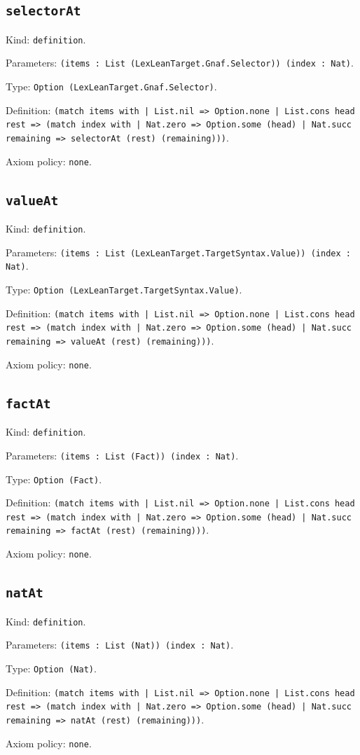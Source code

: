 \documentclass[11pt]{article}
\begin{document}
\subsection*{\texttt{selectorAt}}
\noindent Kind: \texttt{definition}.\par
\noindent Parameters: \texttt{(items : List (LexLeanTarget.Gnaf.Selector)) (index : Nat)}.\par
\noindent Type: \texttt{Option (LexLeanTarget.Gnaf.Selector)}.\par
\noindent Definition: \texttt{(match items with | List.nil => Option.none | List.cons head rest => (match index with | Nat.zero => Option.some (head) | Nat.succ remaining => selectorAt (rest) (remaining)))}.\par
\noindent Axiom policy: \texttt{none}.\par
\subsection*{\texttt{valueAt}}
\noindent Kind: \texttt{definition}.\par
\noindent Parameters: \texttt{(items : List (LexLeanTarget.TargetSyntax.Value)) (index : Nat)}.\par
\noindent Type: \texttt{Option (LexLeanTarget.TargetSyntax.Value)}.\par
\noindent Definition: \texttt{(match items with | List.nil => Option.none | List.cons head rest => (match index with | Nat.zero => Option.some (head) | Nat.succ remaining => valueAt (rest) (remaining)))}.\par
\noindent Axiom policy: \texttt{none}.\par
\subsection*{\texttt{factAt}}
\noindent Kind: \texttt{definition}.\par
\noindent Parameters: \texttt{(items : List (Fact)) (index : Nat)}.\par
\noindent Type: \texttt{Option (Fact)}.\par
\noindent Definition: \texttt{(match items with | List.nil => Option.none | List.cons head rest => (match index with | Nat.zero => Option.some (head) | Nat.succ remaining => factAt (rest) (remaining)))}.\par
\noindent Axiom policy: \texttt{none}.\par
\subsection*{\texttt{natAt}}
\noindent Kind: \texttt{definition}.\par
\noindent Parameters: \texttt{(items : List (Nat)) (index : Nat)}.\par
\noindent Type: \texttt{Option (Nat)}.\par
\noindent Definition: \texttt{(match items with | List.nil => Option.none | List.cons head rest => (match index with | Nat.zero => Option.some (head) | Nat.succ remaining => natAt (rest) (remaining)))}.\par
\noindent Axiom policy: \texttt{none}.\par
\end{document}
